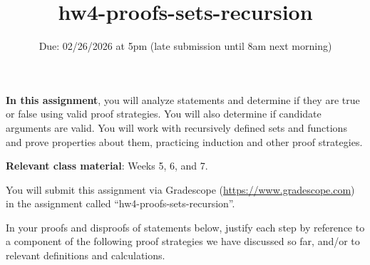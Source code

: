


\title{hw4-proofs-sets-recursion}
\date{Due: 02/26/2026 at 5pm (late submission until 8am next morning)}

\maketitle
\thispagestyle{fancy}


{\bf In this assignment}, you will analyze statements and determine if they are true or false using valid proof strategies.
You will also determine if candidate arguments are valid.
You will work with recursively defined sets and functions and prove 
properties about them, practicing induction and other proof strategies.


{\bf Relevant class material}: Weeks 5, 6, and 7.

You will submit this assignment via Gradescope
(\href{https://www.gradescope.com}{https://www.gradescope.com}) 
in the assignment called ``hw4-proofs-sets-recursion''.

\instructions

In your proofs and disproofs of statements below, justify each  step
by reference to  a component of the  following proof  strategies
we  have discussed so far, and/or to relevant definitions and calculations.

\vspace{-10pt}

